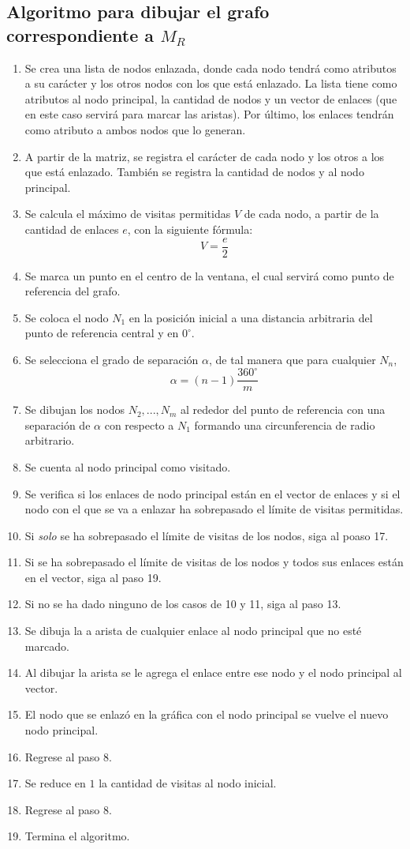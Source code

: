 \documentclass[12pt]{article}
\begin{document}
\subsection{Algoritmo para dibujar el grafo correspondiente a $M_{R}$}
\begin{enumerate}
\item Se crea una lista de nodos enlazada, donde cada nodo tendr\'{a} como atributos a su car\'{a}cter y los otros nodos con los que est\'{a} enlazado. La lista tiene como atributos al nodo principal, la cantidad de nodos y un vector de enlaces (que en este caso servir\'{a} para marcar las aristas). Por \'{u}ltimo, los enlaces tendr\'{a}n como atributo a ambos nodos que lo generan.
\item A partir de la matriz, se registra el car\'{a}cter de cada nodo y los otros a los que est\'{a} enlazado. Tambi\'{e}n se registra la cantidad de nodos y al nodo principal.
\item Se calcula el m\'{a}ximo de visitas permitidas $V$ de cada nodo, a partir de la cantidad de enlaces $e$, con la siguiente f\'{o}rmula: $$V=\frac{e}{2}$$
\item Se marca un punto en el centro de la ventana, el cual servir\'{a} como punto de referencia del grafo.
\item Se coloca el nodo $N_1$ en la posici\'{o}n inicial a una distancia arbitraria del punto de referencia central y en $0^\circ$.
\item Se selecciona el grado de separaci\'{o}n $\alpha$, de tal manera que para cualquier $N_{n}$, $$\alpha = (n-1)\frac{360^{\circ}}{m}$$
\item Se dibujan los nodos $N_{2}, ..., N_{m}$ al rededor del punto de referencia con una separaci\'{o}n de $\alpha$ con respecto a $N_1$ formando una circunferencia de radio arbitrario.
\item Se cuenta al nodo principal como visitado.
\item Se verifica si los enlaces de nodo principal est\'{a}n en el vector de enlaces y si el nodo con el que se va a enlazar ha sobrepasado el l\'{i}mite de visitas permitidas.
\item Si \emph{solo} se ha sobrepasado el l\'{i}mite de visitas de los nodos, siga al poaso 17.
\item Si se ha sobrepasado el l\'{i}mite de visitas de los nodos y todos sus enlaces est\'{a}n en el vector, siga al paso 19.
\item Si no se ha dado ninguno de los casos de 10 y 11, siga al paso 13.
\item Se dibuja la a arista de cualquier enlace al nodo principal que no est\'{e} marcado.
\item Al dibujar la arista se le agrega el enlace entre ese nodo y el nodo principal al vector.
\item El nodo que se enlaz\'{o} en la gr\'{a}fica con el nodo principal se vuelve el nuevo nodo principal.
\item Regrese al paso 8.
\item Se reduce en $1$ la cantidad de visitas al nodo inicial.
\item Regrese al paso 8.
\item Termina el algoritmo.
\end{enumerate}
\newpage
\end{document}
